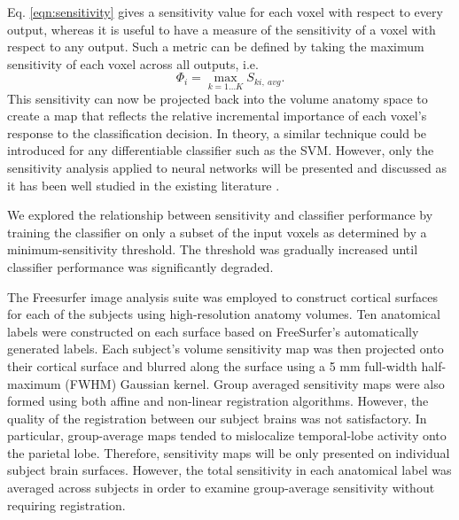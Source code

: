 \documentclass[5p,authoryear]{elsarticle}
\begin{document}
Eq. \ref{eqn:sensitivity} gives a sensitivity value for each voxel with respect to every output, whereas it is useful to have a measure of the sensitivity of a voxel with respect to any output.
Such a metric can be defined by taking the maximum sensitivity of each voxel across all outputs, i.e.
\begin{equation}
\Phi_{i} = \max_{k=1 \dots K}{S_{ki,~avg}}.
\end{equation}
This sensitivity can now be projected back into the volume anatomy space to create a  map that reflects the relative incremental importance of each voxel's response to the classification decision.
In theory, a similar technique could be introduced for any differentiable classifier such as the SVM.
However, only the sensitivity analysis applied to neural networks will be presented and discussed as it has been well studied in the existing literature \citep{Zurada1994}.

We  explored the relationship between sensitivity and classifier performance by training the classifier on only a subset of the input voxels as determined by a minimum-sensitivity threshold.
The threshold was gradually increased until classifier performance was significantly degraded.

The Freesurfer image analysis suite was employed to construct cortical surfaces for each of the subjects using high-resolution anatomy volumes.
Ten anatomical labels were constructed on each surface based on FreeSurfer's automatically generated labels.
Each subject's volume sensitivity map was then projected onto their cortical surface and blurred along the surface using a 5 mm full-width half-maximum (FWHM) Gaussian kernel.
Group averaged sensitivity maps were also formed using both affine and non-linear registration algorithms.
However, the quality of the registration between our subject brains was not satisfactory.
In particular, group-average maps tended to mislocalize temporal-lobe activity onto the parietal lobe.
Therefore, sensitivity maps will be only presented on individual subject brain surfaces.
However, the total sensitivity in each anatomical label was averaged across subjects in order to examine group-average sensitivity without requiring registration.
\end{document}
